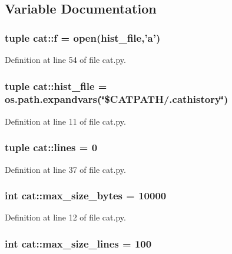 \subsection{Variable Documentation}
\hypertarget{namespacecat_a745fdeb4b562b7efdbfd1d05ee5db903}{
\subsubsection[{f}]{\setlength{\rightskip}{0pt plus 5cm}tuple {\bf cat::f} = open({\bf hist\_\-file},'a')}}
\label{namespacecat_a745fdeb4b562b7efdbfd1d05ee5db903}


Definition at line 54 of file cat.py.\hypertarget{namespacecat_a1831d88841943766deffd7e36aea5d5e}{
\subsubsection[{hist\_\-file}]{\setlength{\rightskip}{0pt plus 5cm}tuple {\bf cat::hist\_\-file} = os.path.expandvars(\char`\"{}\$CATPATH/.cathistory\char`\"{})}}
\label{namespacecat_a1831d88841943766deffd7e36aea5d5e}


Definition at line 11 of file cat.py.\hypertarget{namespacecat_a9ac0227214d191647fb3a27229333ec3}{
\subsubsection[{lines}]{\setlength{\rightskip}{0pt plus 5cm}tuple {\bf cat::lines} = 0}}
\label{namespacecat_a9ac0227214d191647fb3a27229333ec3}


Definition at line 37 of file cat.py.\hypertarget{namespacecat_a4834511904f5301f0e7e630b905f41f4}{
\subsubsection[{max\_\-size\_\-bytes}]{\setlength{\rightskip}{0pt plus 5cm}int {\bf cat::max\_\-size\_\-bytes} = 10000}}
\label{namespacecat_a4834511904f5301f0e7e630b905f41f4}


Definition at line 12 of file cat.py.\hypertarget{namespacecat_ae978903cc863912f5726d4cc88f7468d}{
\subsubsection[{max\_\-size\_\-lines}]{\setlength{\rightskip}{0pt plus 5cm}int {\bf cat::max\_\-size\_\-lines} = 100}}
\label{namespacecat_ae978903cc863912f5726d4cc88f7468d}


